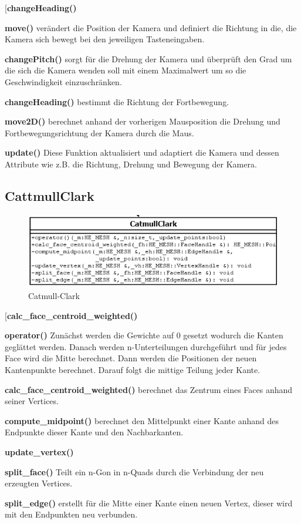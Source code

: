 	\begin{labeling}[]{[\textbf{changeHeading()}}%
	\item[\textbf{move()}] verändert die Position der Kamera und definiert die Richtung in die, die Kamera sich bewegt bei den jeweiligen Tasteneingaben.
	\item[\textbf{changePitch()}] sorgt für die Drehung der Kamera und überprüft den Grad um die sich die Kamera wenden soll mit einem Maximalwert um so die Geschwindigkeit einzuschränken.
	\item[\textbf{changeHeading()}] bestimmt die Richtung der Fortbewegung.
	\item[\textbf{move2D()}] berechnet anhand der vorherigen Mausposition die Drehung und Fortbewegungsrichtung der Kamera durch die Maus.
	\item[\textbf{update()}] Diese Funktion aktualisiert und adaptiert die Kamera und dessen Attribute wie z.B. die Richtung, Drehung und Bewegung der Kamera.
	\end{labeling}
	
\subsection{CattmullClark}


\begin{figure}[H]
	\centering
	\includegraphics[width=0.7\linewidth]{CatmullClark.png}
	\caption{Catmull-Clark}
	\label{fig4}
	\end{figure}

	\begin{labeling}[]{[\textbf{calc\_face\_centroid\_weighted()}}%
	\item[\textbf{operator()}] Zunächst werden die Gewichte auf 0 gesetzt wodurch die Kanten geglättet werden. Danach werden n-Unterteilungen durchgeführt und für jedes Face wird die Mitte berechnet. Dann werden die Positionen der neuen Kantenpunkte berechnet. Darauf folgt die mittige Teilung jeder Kante.
	\item[\textbf{calc\_face\_centroid\_weighted()}] berechnet das Zentrum eines Faces anhand seiner Vertices.
	\item[\textbf{compute\_midpoint()}] berechnet den Mittelpunkt einer Kante anhand des Endpunkte dieser Kante und den Nachbarkanten.
	\item[\textbf{update\_vertex()}]
	\item[\textbf{split\_face()}] Teilt ein n-Gon in n-Quads durch die Verbindung der neu erzeugten Vertices.
	\item[\textbf{split\_edge()}] erstellt für die Mitte einer Kante einen neuen Vertex, dieser wird mit den Endpunkten neu verbunden.
	\end{labeling}

